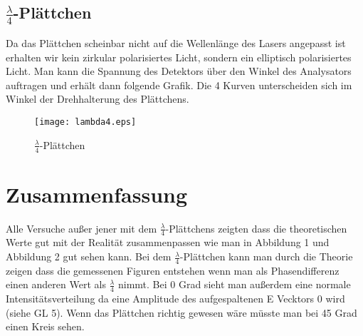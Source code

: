\documentclass[a4paper]{article}
\begin{document}
  \subsection{$\frac{\lambda}{4}$-Plättchen}
  Da das Plättchen scheinbar nicht auf die Wellenlänge des Lasers angepasst ist erhalten wir kein zirkular polarisiertes Licht, sondern ein elliptisch polarisiertes Licht. Man kann die Spannung des Detektors über den Winkel des Analysators auftragen und erhält dann folgende Grafik. Die 4 Kurven unterscheiden sich im Winkel der Drehhalterung des Plättchens.

  \begin{figure}[ht]
    \begin{center}
      \texttt{[image: lambda4.eps]}
    \end{center}
    \caption{$\frac{\lambda}{4}$-Plättchen}
    \label{fig:3}
  \end{figure}

  \section{Zusammenfassung}

  Alle Versuche außer jener mit dem $\frac{\lambda}{4}$-Plättchens zeigten dass die theoretischen Werte gut mit der Realität zusammenpassen wie man in Abbildung 1 und Abbildung 2 gut sehen kann. Bei dem $\frac{\lambda}{4}$-Plättchen kann man durch die Theorie zeigen dass die gemessenen Figuren entstehen wenn man als Phasendifferenz einen anderen Wert als $\frac{\lambda}{4}$ nimmt. Bei 0 Grad sieht man außerdem eine normale Intensitätsverteilung da eine Amplitude des
  aufgespaltenen E Vecktors 0 wird (siehe GL 5). Wenn das Plättchen richtig gewesen wäre müsste man bei 45 Grad einen Kreis sehen.
\end{document}
